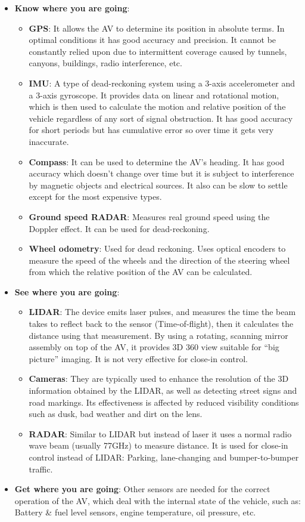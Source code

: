 \documentclass[11pt]{article}
\begin{document}
\begin{itemize}
	\item \textbf{Know where you are going}:
		\begin{itemize}
			\item \textbf{GPS}: It allows the AV to determine its position in absolute terms. In optimal conditions it has good accuracy and precision. It cannot be constantly relied upon due to intermittent coverage caused by tunnels, canyons, buildings, radio interference, etc.
			\item \textbf{IMU}: A type of dead-reckoning system using a 3-axis accelerometer and a 3-axis gyroscope. It provides data on linear and rotational motion, which is then used to calculate the motion and relative position of the vehicle regardless of any sort of signal obstruction. It has good accuracy for short periods but has cumulative error so over time it gets very inaccurate.
			\item \textbf{Compass}: It can be used to determine the AV's heading. It has good accuracy which doesn't change over time but it is subject to interference by magnetic objects and electrical sources. It also can be slow to settle except for the most expensive types.
			\item \textbf{Ground speed RADAR}: Measures real ground speed using the Doppler effect. It can be used for dead-reckoning.
			\item \textbf{Wheel odometry}: Used for dead reckoning. Uses optical encoders to measure the speed of the wheels and the direction of the steering wheel from which the relative position of the AV can be calculated.
		\end{itemize}
	\item \textbf{See where you are going}:
		\begin{itemize}
			\item \textbf{LIDAR}: The device emits laser pulses, and measures the time the beam takes to reflect back to the sensor (Time-of-flight), then it calculates the distance using that measurement. By using a rotating, scanning mirror assembly on top of the AV, it provides 3D 360{\textdegree} view suitable for ``big picture'' imaging. It is not very effective for close-in control.
			\item \textbf{Cameras}: They are typically used to enhance the resolution of the 3D information obtained by the LIDAR, as well as detecting street signs and road markings. Its effectiveness is affected by reduced visibility conditions such as dusk, bad weather and dirt on the lens.
			\item \textbf{RADAR}: Similar to LIDAR but instead of laser it uses a normal radio wave beam (usually 77GHz) to measure distance. It is used for close-in control instead of LIDAR: Parking, lane-changing and bumper-to-bumper traffic.
		\end{itemize}
	\item \textbf{Get where you are going}:
		Other sensors are needed for the correct operation of the AV, which deal with the internal state of the vehicle, such as: Battery \& fuel level sensors, engine temperature, oil pressure, etc.
\end{itemize}
\end{document}
